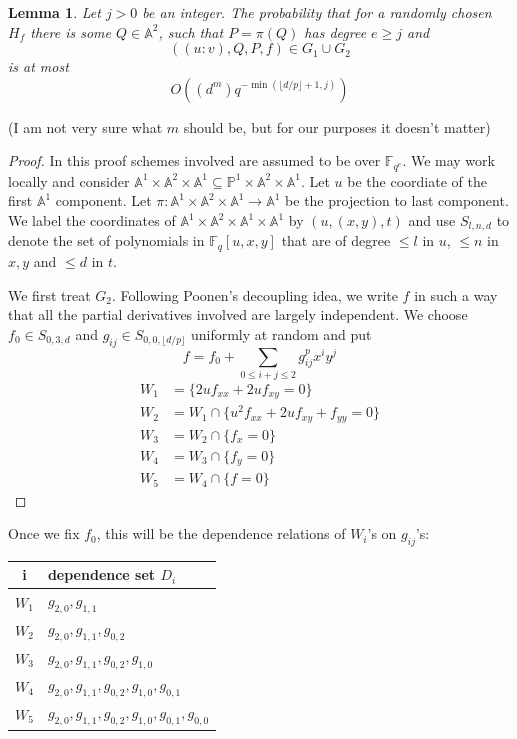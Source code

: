 \documentclass[12pt]{article}
\theoremstyle{plain}
\newtheorem{lemma}[equation]{Lemma}
\theoremstyle{definition}
\newcommand{\IA}{\mathbb{A}}
\newcommand{\IF}{\mathbb{F}}
\newcommand{\IP}{\mathbb{P}}
\newcommand{\Spec}{\rm Spec\,}
\newcommand{\<}{\langle}
\renewcommand{\>}{\rangle}
\newcommand{\fl}[1]{\lfloor #1 \rfloor}
\begin{document}
\begin{lemma}
\label{projection}
Let $j > 0$ be an integer. The probability that for a randomly chosen $H_f$ there is some $Q \in \IA^2$, such that $P = \pi(Q)$ has degree $e \ge j$ and  
$$ ((u : v), Q, P, f) \in G_1 \cup G_2 $$
is at most 
$$ O((d^m) q^{-\min(\fl{d/p} + 1, j)})$$
\end{lemma}
(I am not very sure what $m$ should be, but for our purposes it doesn't matter)
\begin{proof}
In this proof schemes involved are assumed to be over $\IF_{q^e}$. We may work locally and consider $\IA^1 \times \IA^2 \times \IA^1 \subseteq \IP^1 \times \IA^2 \times \IA^1$. Let $u$ be the coordiate of the first $\IA^1$ component. Let $\pi : \IA^1 \times \IA^2 \times \IA^1 \to \IA^1$ be the projection to last component. We label the coordinates of $\IA^1 \times \IA^2 \times \IA^1 \times \IA^1$ by $(u, (x, y), t)$ and use $S_{l, n, d}$ to denote the set of polynomials in $\IF_q[u, x, y]$ that are of degree $\le l$ in $u$, $\le n$ in $x, y$ and $\le d$ in $t$. 

We first treat $G_2$. Following Poonen's decoupling idea, we write $f$ in such a way that all the partial derivatives involved are largely independent. We choose $f_0 \in S_{0, 3, d}$ and $g_{ij} \in S_{0, 0, \fl{d/p}}$ uniformly at random and put 
$$ f = f_0 + \sum_{0 \le i + j \le 2} g_{ij}^p x^i y^j$$
\begin{align*}
W_1 &= \{ 2u f_{xx} + 2u f_{xy} = 0 \}\\
W_2 &= W_1 \cap \{u^2 f_{xx} + 2u f_{xy} + f_{yy} = 0\}\\
W_3 &= W_2 \cap \{ f_x = 0 \} \\
W_4 &= W_3 \cap \{ f_y = 0 \} \\
W_5 &= W_4 \cap \{ f = 0 \}
\end{align*}
\end{proof}
Once we fix $f_0$, this will be the dependence relations of $W_i$'s on $g_{ij}$'s:
\begin{center}
\begin{tabular}{|c | l |}
\hline
i & dependence set $D_i$ \\ \hline
$W_1$ & $g_{2, 0}, g_{1, 1}$ \\ \hline
$W_2$ & $g_{2, 0}, g_{1, 1}, g_{0, 2}$ \\ \hline
$W_3$ & $g_{2, 0}, g_{1, 1}, g_{0, 2}, g_{1, 0}$ \\ \hline
$W_4$ & $g_{2, 0}, g_{1, 1}, g_{0, 2}, g_{1, 0}, g_{0, 1}$ \\ \hline
$W_5$ & $g_{2, 0}, g_{1, 1}, g_{0, 2}, g_{1, 0}, g_{0, 1}, g_{0, 0}$ \\ \hline
\end{tabular}
\end{center}
\end{document}
